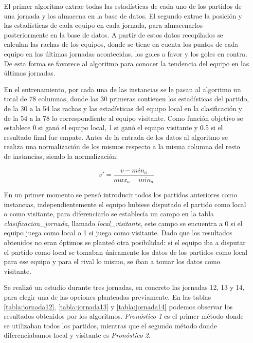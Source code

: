 El primer algoritmo extrae todas las estadísticas de cada uno de los partidos de una jornada y los almacena en la base de datos. El segundo extrae la posición y las estadísticas de cada equipo en cada jornada, para almacenarlos posteriormente en la base de datos. A partir de estos datos recopilados se calculan las rachas de los equipos, donde se tiene en cuenta los puntos de cada equipo en las últimas jornadas acontecidas, los goles a favor y  los goles en contra. De esta forma se favorece al algoritmo para conocer la tendencia del equipo en las últimas jornadas. 

En el entrenamiento, por cada una de las instancias se le pasan al algoritmo un total de 78 columnas, donde las 30 primeras contienen los estadísticas del partido, de la 30 a la 54 las rachas y las estadísticas del equipo local en la clasificación y de la 54 a la 78 lo correspondiente al equipo visitante. Como función objetivo se establece 0 si ganó el equipo local, 1 si ganó el equipo visitante y 0.5 si el resultado final fue empate.
Antes de la entrada de los datos al algoritmo se realiza una normalización de los mismos respecto a la misma columna del resto de instancias, siendo la normalización:
\begin{center}
\large{$$v' = \frac{v-min_{a}}{max_{a}-min_{a}}$$}
\end{center}

En un primer momento se pensó introducir todos los partidos anteriores como instancias, independientemente el equipo hubiese disputado el partido como local o como visitante, para diferenciarlo se establecía un campo en la tabla \textit{clasificacion\_jornada}, llamado \textit{local\_visitante}, este campo se encuentra a 0 si el equipo juega como local o 1 si juega como visitante. Dado que los resultados obtenidos no eran óptimos se planteó otra posibilidad: si el equipo iba a disputar el partido como local se tomaban únicamente los datos de los partidos como local para ese equipo y para el rival lo mismo, se iban a tomar los datos como visitante.

Se realizó un estudio durante tres jornadas, en concreto las jornadas 12, 13 y 14, para elegir una de las opciones planteadas previamente. En las tablas \ref{tabla:jornada12}, \ref{tabla:jornada13} y \ref{tabla:jornada14} podemos observar los resultados obtenidos por los algoritmos. \textit{Pronóstico 1} es el primer método donde se utilizaban todos los partidos, mientras que el segundo método donde diferenciabamos local y visitante es \textit{Pronóstico 2}.

